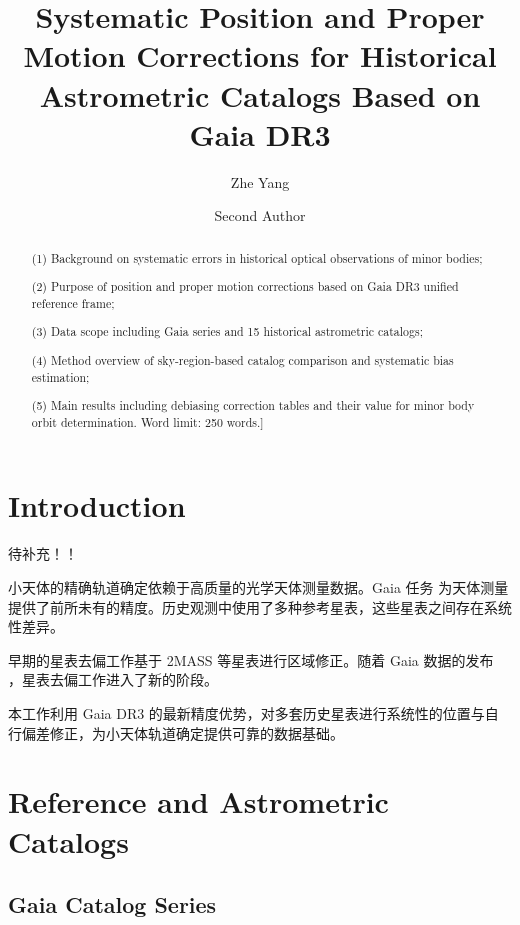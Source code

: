 \documentclass{aastex701}
\begin{document}
\title{Systematic Position and Proper Motion Corrections for Historical Astrometric Catalogs Based on Gaia DR3}

\author{Zhe Yang}

\author{Second Author}

\begin{abstract}
(1) Background on systematic errors in historical optical observations of minor bodies; 

(2) Purpose of position and proper motion corrections based on Gaia DR3 unified reference frame; 

(3) Data scope including Gaia series and 15 historical astrometric catalogs; 

(4) Method overview of sky-region-based catalog comparison and systematic bias estimation; 

(5) Main results including debiasing correction tables and their value for minor body orbit determination. Word limit: 250 words.]

\end{abstract}


\section{Introduction} \label{sec:intro}
待补充！！

小天体的精确轨道确定依赖于高质量的光学天体测量数据。Gaia 任务 \citep{2022ApJ...935..167A} 为天体测量提供了前所未有的精度。历史观测中使用了多种参考星表，这些星表之间存在系统性差异。

早期的星表去偏工作基于 2MASS 等星表进行区域修正。随着 Gaia 数据的发布 \citep{2018AJ....156..123A}，星表去偏工作进入了新的阶段。

本工作利用 Gaia DR3 的最新精度优势，对多套历史星表进行系统性的位置与自行偏差修正，为小天体轨道确定提供可靠的数据基础。

\section{Reference and Astrometric Catalogs} \label{sec:catalogs}
\subsection{Gaia Catalog Series} \label{subsec:gaia}
\end{document}
